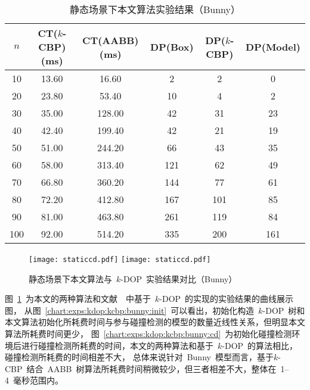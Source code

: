\begin{table}[htb]  
\centering
\caption{静态场景下本文算法实验结果（Bunny）}
\label{tab:exp:bunny:k24:kdop:kcbp:detail}
\begin{tabular}{cccccc}
\toprule[1.5pt]
$n$ & CT($k$-CBP)(ms) &  CT(AABB)(ms) & DP(Box) & DP($k$-CBP) & DP(Model)\\
\midrule[1.0pt]
10 &  13.60 &	16.60      & 2   &2   & 0  \\
20 &  23.80 &	53.40      & 10  &4   & 2  \\
30 &  35.00 &	128.00     & 42  &31  & 23 \\
40 &  42.40 &	199.40     & 42  &21  & 19 \\
50 &  51.00 &	244.20     & 66  &43  & 35 \\
60 &  58.00 &	313.40     & 121 &62  & 49 \\
70 &  66.80 &	360.20     & 144 &77  & 61 \\
80 &  72.20 &	412.80     & 167 &101 & 85 \\
90 &  81.00 &	463.80     & 261 &119 & 84 \\
100&  92.00 &	514.20     & 335 &200 & 161\\
\bottomrule[1.5pt]
\end{tabular}
\end{table}

\begin{figure}[htb] 
\centering
{}
{
    \texttt{[image: staticcd.pdf]}
}
\hspace{1em}
{  
   \texttt{[image: staticcd.pdf]}
}
\caption{静态场景下本文算法与~$k$-DOP~实验结果对比（Bunny）}
\label{chart:exps:kdop:kcbp:bunny}
\end{figure}

图~\ref{chart:exps:kdop:kcbp:bunny}~为本文的两种算法和文献~~中基于~$k$-DOP~的实现的实验结果的曲线展示图，
从图~\ref{chart:exps:kdop:kcbp:bunny:init}~可以看出，初始化构造~$k$-DOP~树和本文算法初始化所耗费时间与参与碰撞检测的模型的数量近线性关系，但明显本文算法所耗费时间更少，
图~\ref{chart:exps:kdop:kcbp:bunny:cd}~为初始化碰撞检测环境后进行碰撞检测所耗费的时间，本文的两种算法和基于~$k$-DOP~的算法相比，碰撞检测所耗费的时间相差不大，
总体来说针对~Bunny~模型而言，基于$k$-CBP~结合~AABB~树算法所耗费时间稍微较少，但三者相差不大，整体在~1--4~毫秒范围内。


